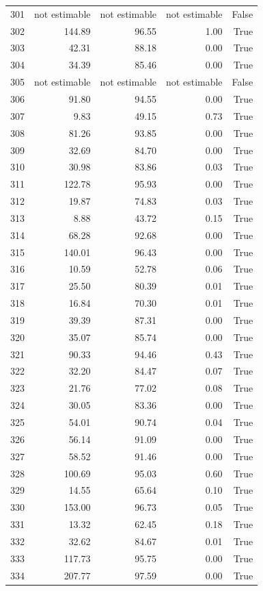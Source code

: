 \begin{longtable}{rrrrr}
301 & not estimable & not estimable & not estimable & False \\
302 & 144.89 & 96.55 & 1.00 & True \\
303 & 42.31 & 88.18 & 0.00 & True \\
304 & 34.39 & 85.46 & 0.00 & True \\
305 & not estimable & not estimable & not estimable & False \\
306 & 91.80 & 94.55 & 0.00 & True \\
307 & 9.83 & 49.15 & 0.73 & True \\
308 & 81.26 & 93.85 & 0.00 & True \\
309 & 32.69 & 84.70 & 0.00 & True \\
310 & 30.98 & 83.86 & 0.03 & True \\
311 & 122.78 & 95.93 & 0.00 & True \\
312 & 19.87 & 74.83 & 0.03 & True \\
313 & 8.88 & 43.72 & 0.15 & True \\
314 & 68.28 & 92.68 & 0.00 & True \\
315 & 140.01 & 96.43 & 0.00 & True \\
316 & 10.59 & 52.78 & 0.06 & True \\
317 & 25.50 & 80.39 & 0.01 & True \\
318 & 16.84 & 70.30 & 0.01 & True \\
319 & 39.39 & 87.31 & 0.00 & True \\
320 & 35.07 & 85.74 & 0.00 & True \\
321 & 90.33 & 94.46 & 0.43 & True \\
322 & 32.20 & 84.47 & 0.07 & True \\
323 & 21.76 & 77.02 & 0.08 & True \\
324 & 30.05 & 83.36 & 0.00 & True \\
325 & 54.01 & 90.74 & 0.04 & True \\
326 & 56.14 & 91.09 & 0.00 & True \\
327 & 58.52 & 91.46 & 0.00 & True \\
328 & 100.69 & 95.03 & 0.60 & True \\
329 & 14.55 & 65.64 & 0.10 & True \\
330 & 153.00 & 96.73 & 0.05 & True \\
331 & 13.32 & 62.45 & 0.18 & True \\
332 & 32.62 & 84.67 & 0.01 & True \\
333 & 117.73 & 95.75 & 0.00 & True \\
334 & 207.77 & 97.59 & 0.00 & True \\

\end{longtable}

